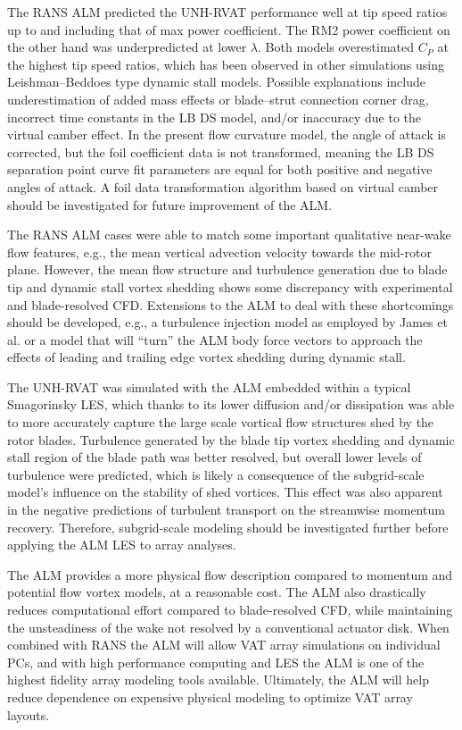 \documentclass[times]{weauth}
\begin{document}
The RANS ALM predicted the UNH-RVAT performance well at tip speed ratios up to
and including that of max power coefficient. The RM2 power coefficient on the
other hand was underpredicted at lower $\lambda$. Both models overestimated
$C_P$ at the highest tip speed ratios, which has been observed in other
simulations using Leishman--Beddoes type dynamic stall models. Possible
explanations include underestimation of added mass effects or blade--strut
connection corner drag, incorrect time constants in the LB DS model, and/or
inaccuracy due to the virtual camber effect. In the present flow curvature
model, the angle of attack is corrected, but the foil coefficient data is not
transformed, meaning the LB DS separation point curve fit parameters are equal
for both positive and negative angles of attack. A foil data transformation
algorithm based on virtual camber should be investigated for future improvement
of the ALM.

The RANS ALM cases were able to match some important qualitative near-wake flow
features, e.g., the mean vertical advection velocity towards the mid-rotor
plane. However, the mean flow structure and turbulence generation due to blade
tip and dynamic stall vortex shedding shows some discrepancy with experimental
and blade-resolved CFD. Extensions to the ALM to deal with these shortcomings
should be developed, e.g., a turbulence injection model as employed by James et
al. \cite{James2010} or a model that will ``turn'' the ALM body force vectors to
approach the effects of leading and trailing edge vortex shedding during dynamic
stall.

The UNH-RVAT was simulated with the ALM embedded within a typical Smagorinsky
LES, which thanks to its lower diffusion and/or dissipation was able to more
accurately capture the large scale vortical flow structures shed by the rotor
blades. Turbulence generated by the blade tip vortex shedding and dynamic stall
region of the blade path was better resolved, but overall lower levels of
turbulence were predicted, which is likely a consequence of the subgrid-scale
model's influence on the stability of shed vortices. This effect was also
apparent in the negative predictions of turbulent transport on the streamwise
momentum recovery. Therefore, subgrid-scale modeling should be investigated
further before applying the ALM LES to array analyses.

The ALM provides a more physical flow description compared to momentum and
potential flow vortex models, at a reasonable cost. The ALM also drastically
reduces computational effort compared to blade-resolved CFD, while maintaining
the unsteadiness of the wake not resolved by a conventional actuator disk. When
combined with RANS the ALM will allow VAT array simulations on individual PCs,
and with high performance computing and LES the ALM is one of the highest
fidelity array modeling tools available. Ultimately, the ALM will help reduce
dependence on expensive physical modeling to optimize VAT array layouts.
\end{document}
